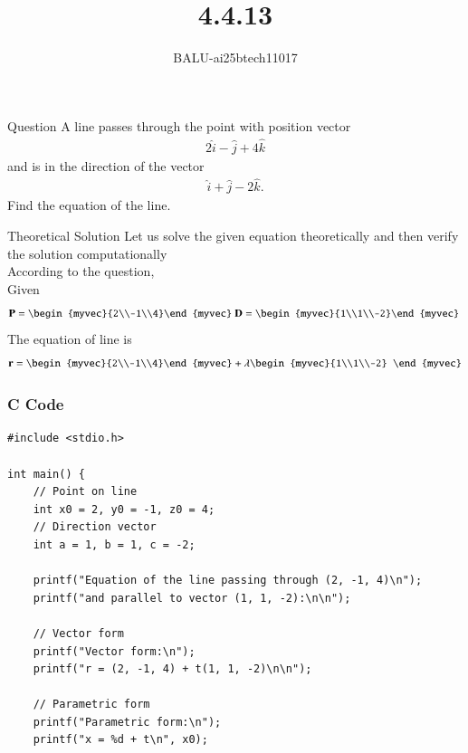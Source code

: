 \documentclass{beamer}
\title %
{4.4.13}
\author %
{BALU-ai25btech11017}
\begin{document}
\frame{\titlepage}
\begin{frame}{Question}
A line passes through the point with position vector 
\begin{align}
2\hat{i} - \hat{j} + 4\hat{k}
\end{align}
and is in the direction of the vector 
\begin{align}
\hat{i} + \hat{j} - 2\hat{k}.
\end{align}
Find the equation of the line.\\ 
\end{frame}
\begin{frame}{Theoretical Solution}
Let us solve the given equation theoretically and then verify the solution computationally \\
According to the question, \\
Given\\
\begin{align}
\vec{P}=\begin{myvec}{2\\-1\\4}\end{myvec}\
\vec{D}=\begin{myvec}{1\\1\\-2}\end{myvec}\
\end{align}
The equation of line is
   \begin{align}
 \vec{r}=\begin{myvec}{2\\-1\\4}\end{myvec}+\lambda\begin{myvec}{1\\1\\-2}
 \end{myvec}
\end{align}
\end{frame}
\begin{frame}[fragile]
    \frametitle{C Code}

    \begin{lstlisting}
#include <stdio.h>

int main() {
    // Point on line
    int x0 = 2, y0 = -1, z0 = 4;
    // Direction vector
    int a = 1, b = 1, c = -2;

    printf("Equation of the line passing through (2, -1, 4)\n");
    printf("and parallel to vector (1, 1, -2):\n\n");

    // Vector form
    printf("Vector form:\n");
    printf("r = (2, -1, 4) + t(1, 1, -2)\n\n");

    // Parametric form
    printf("Parametric form:\n");
    printf("x = %d + t\n", x0);
     \end{lstlisting}
\end{frame}
\end{document}

